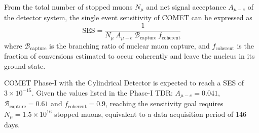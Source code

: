From the total number of stopped muons $N_\mu$ and net signal acceptance
$A_{\mu-e}$ of the detector system, the single event sensitivity of COMET can be
expressed as
\begin{equation}
    \mathrm{SES} = \frac{1}{N_\mu \  A_{\mu-e} \  
    \mathcal{B}_\mathrm{capture} \  f_\mathrm{coherent}}
\end{equation}
where $\mathcal{B}_\mathrm{capture}$ is the branching ratio of nuclear muon capture,
and $f_\mathrm{coherent}$ is the fraction of conversions estimated to occur
coherently and leave the nucleus in its ground state.



COMET Phase-I with the Cylindrical Detector is expected to reach a SES of $3
\times 10^{-15}$. Given the values listed in the Phase-I TDR: $A_{\mu-e} =
0.041$, $\mathcal{B}_\mathrm{capture} = 0.61$ and $f_\mathrm{coherent} = 0.9$,
reaching the sensitivity goal requires $N_\mu = 1.5 \times 10^{16}$ stopped
muons, equivalent to a data acquisition period of 146 days.